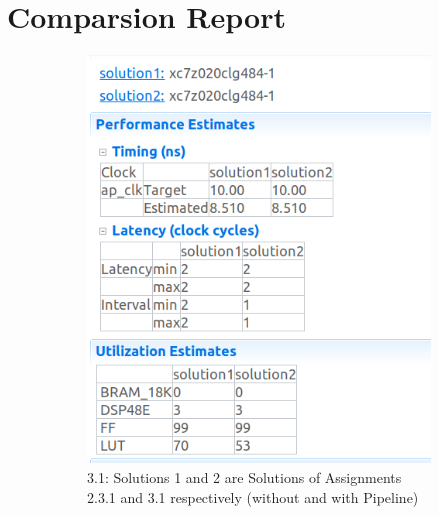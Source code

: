 \documentclass{article}
\begin{document}
\section{Comparsion Report}
\vspace{1cm}
\begin{figure}[h]
\centering
\begin{subfigure}[b]{0.6\textwidth}
    \centering
\includegraphics[width=\textwidth]{figs/351.png}
    \caption{3.1: Solutions 1 and 2 are Solutions of Assignments 2.3.1 and 3.1 respectively (without and with Pipeline)}
    \label{fig:my_label}
\end{subfigure}
\hfill
\begin{subfigure}[b]{0.6\textwidth}
    \centering

\end{subfigure}
\end{figure}
\end{document}
